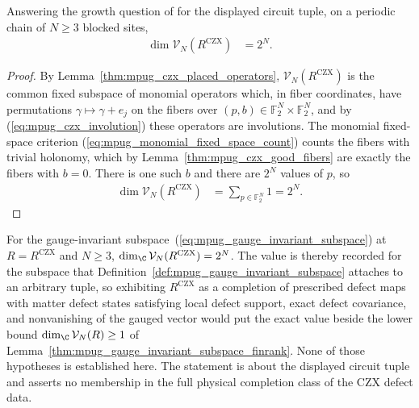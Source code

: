 \begin{lemma}
    \label{thm:mpug_czx_dimension}
    \leanok
    Answering the growth question of
    \cite[lines~5198--5204]{FrancoRubio2025MPUGauging} for the displayed
    circuit tuple, on a periodic chain of $N\geq3$ blocked sites,
    \begin{align}
        \dim\mathcal V_N(R^{\mathrm{CZX}}) & =2^N.
        \label{eq:mpug_czx_dimension}
    \end{align}
\end{lemma}

\begin{proof}\leanok
    By Lemma~\ref{thm:mpug_czx_placed_operators},
    $\mathcal V_N(R^{\mathrm{CZX}})$ is the common fixed subspace of monomial
    operators which, in fiber coordinates, have permutations
    $\gamma\mapsto\gamma+e_j$ on the fibers over
    $(p,b)\in\mathbb F_2^N\times\mathbb F_2^N$, and by
    (\ref{eq:mpug_czx_involution}) these operators are involutions. The
    monomial fixed-space criterion
    (\ref{eq:mpug_monomial_fixed_space_count}) counts the fibers with trivial
    holonomy, which by Lemma~\ref{thm:mpug_czx_good_fibers} are exactly
    the fibers with $b=0$. There is one such $b$ and there are $2^N$ values
    of $p$, so
    \begin{align}
        \dim\mathcal V_N(R^{\mathrm{CZX}})
         & =\sum_{p\in\mathbb F_2^N}1=2^N.
    \end{align}
\end{proof}

\begin{lemma}
    \label{thm:mpug_czx_dimension_of_completion}
    \leanok
    For the gauge-invariant subspace~(\ref{eq:mpug_gauge_invariant_subspace}) at
    $R=R^{\mathrm{CZX}}$ and $N\geq3$,
    $\dim_{\C}\mathcal V_N(R^{\mathrm{CZX}})\allowbreak=2^N$. The value is thereby
    recorded for the subspace that
    Definition~\ref{def:mpug_gauge_invariant_subspace} attaches to an arbitrary
    tuple, so exhibiting $R^{\mathrm{CZX}}$ as a completion of prescribed
    defect maps with matter defect states satisfying local defect support,
    exact defect covariance, and nonvanishing of the gauged vector would put
    the exact value beside the lower bound $\dim_{\C}\mathcal V_N(R)\geq1$ of
    Lemma~\ref{thm:mpug_gauge_invariant_subspace_finrank}. None of those
    hypotheses is established here. The statement is about the displayed
    circuit tuple and asserts no membership in the full physical completion
    class of the CZX defect data.
\end{lemma}

